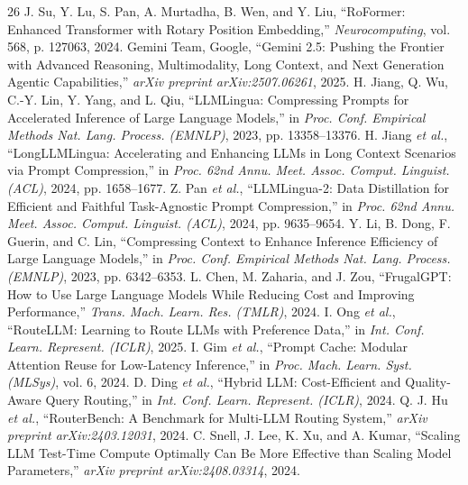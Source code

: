 \documentclass[conference,10pt]{IEEEtran}
\begin{document}
\begin{thebibliography}{26}
 J. Su, Y. Lu, S. Pan, A. Murtadha, B. Wen, and Y. Liu, ``RoFormer: Enhanced Transformer with Rotary Position Embedding,'' \emph{Neurocomputing}, vol. 568, p. 127063, 2024.
 Gemini Team, Google, ``Gemini 2.5: Pushing the Frontier with Advanced Reasoning, Multimodality, Long Context, and Next Generation Agentic Capabilities,'' \emph{arXiv preprint arXiv:2507.06261}, 2025.
 H. Jiang, Q. Wu, C.-Y. Lin, Y. Yang, and L. Qiu, ``LLMLingua: Compressing Prompts for Accelerated Inference of Large Language Models,'' in \emph{Proc. Conf. Empirical Methods Nat. Lang. Process. (EMNLP)}, 2023, pp. 13358--13376.
 H. Jiang \emph{et al.}, ``LongLLMLingua: Accelerating and Enhancing LLMs in Long Context Scenarios via Prompt Compression,'' in \emph{Proc. 62nd Annu. Meet. Assoc. Comput. Linguist. (ACL)}, 2024, pp. 1658--1677.
 Z. Pan \emph{et al.}, ``LLMLingua-2: Data Distillation for Efficient and Faithful Task-Agnostic Prompt Compression,'' in \emph{Proc. 62nd Annu. Meet. Assoc. Comput. Linguist. (ACL)}, 2024, pp. 9635--9654.
 Y. Li, B. Dong, F. Guerin, and C. Lin, ``Compressing Context to Enhance Inference Efficiency of Large Language Models,'' in \emph{Proc. Conf. Empirical Methods Nat. Lang. Process. (EMNLP)}, 2023, pp. 6342--6353.
 L. Chen, M. Zaharia, and J. Zou, ``FrugalGPT: How to Use Large Language Models While Reducing Cost and Improving Performance,'' \emph{Trans. Mach. Learn. Res. (TMLR)}, 2024.
 I. Ong \emph{et al.}, ``RouteLLM: Learning to Route LLMs with Preference Data,'' in \emph{Int. Conf. Learn. Represent. (ICLR)}, 2025.
 I. Gim \emph{et al.}, ``Prompt Cache: Modular Attention Reuse for Low-Latency Inference,'' in \emph{Proc. Mach. Learn. Syst. (MLSys)}, vol. 6, 2024.
 D. Ding \emph{et al.}, ``Hybrid LLM: Cost-Efficient and Quality-Aware Query Routing,'' in \emph{Int. Conf. Learn. Represent. (ICLR)}, 2024.
 Q. J. Hu \emph{et al.}, ``RouterBench: A Benchmark for Multi-LLM Routing System,'' \emph{arXiv preprint arXiv:2403.12031}, 2024.
 C. Snell, J. Lee, K. Xu, and A. Kumar, ``Scaling LLM Test-Time Compute Optimally Can Be More Effective than Scaling Model Parameters,'' \emph{arXiv preprint arXiv:2408.03314}, 2024.
\end{thebibliography}
\end{document}
